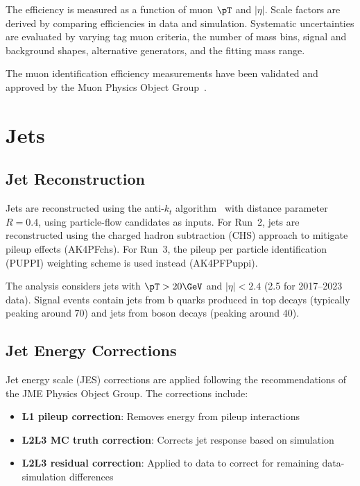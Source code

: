 The efficiency is measured as a function of muon $\pT$ and $|\eta|$. Scale factors are derived by comparing efficiencies in data and simulation. Systematic uncertainties are evaluated by varying tag muon criteria, the number of mass bins, signal and background shapes, alternative generators, and the fitting mass range.

The muon identification efficiency measurements have been validated and approved by the Muon Physics Object Group~\cite{MUO-IDApproval-Run2, MUO-IDApproval-Run3}.

\section{Jets}
\label{sec:jet_id}

\subsection{Jet Reconstruction}

Jets are reconstructed using the anti-$k_t$ algorithm~\cite{Cacciari:2008gp} with distance parameter $R = 0.4$, using particle-flow candidates as inputs. For Run~2, jets are reconstructed using the charged hadron subtraction (CHS) approach to mitigate pileup effects (AK4PFchs). For Run~3, the pileup per particle identification (PUPPI) weighting scheme is used instead (AK4PFPuppi).

The analysis considers jets with $\pT > 20\GeV$ and $|\eta| < 2.4$ (2.5 for 2017--2023 data). Signal events contain jets from b quarks produced in top decays (typically peaking around 70\GeV) and jets from \PW boson decays (peaking around 40\GeV).

\subsection{Jet Energy Corrections}

Jet energy scale (JES) corrections are applied following the recommendations of the JME Physics Object Group. The corrections include:
\begin{itemize}
\item \textbf{L1 pileup correction}: Removes energy from pileup interactions
\item \textbf{L2L3 MC truth correction}: Corrects jet response based on simulation
\item \textbf{L2L3 residual correction}: Applied to data to correct for remaining data-simulation differences
\end{itemize}

